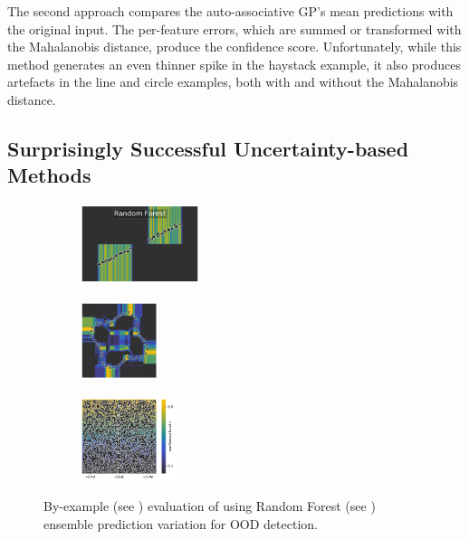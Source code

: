The second approach compares the auto-associative GP's mean predictions with the original input. The per-feature errors, which are summed or transformed with the Mahalanobis distance, produce the confidence score. Unfortunately, while this method generates an even thinner spike in the haystack example, it also produces artefacts in the line and circle examples, both with and without the Mahalanobis distance.

\subsection{Surprisingly Successful Uncertainty-based Methods} \label{txt:ood-detection-analysis-uq}

\begin{figure}[H]
    \centering
    \begin{subfigure}
        \centering
        \includegraphics[width=0.388\textwidth,valign=t]{ood-detection/figures/ood-detection/confidence-line-rf.pdf}
    \end{subfigure}
    \begin{subfigure}
        \centering
        \includegraphics[width=0.254\textwidth,valign=t]{ood-detection/figures/ood-detection/confidence-circle-rf.pdf}
    \end{subfigure}
    \begin{subfigure}
        \centering
        \includegraphics[width=0.308\textwidth,valign=t]{ood-detection/figures/ood-detection/confidence-haystack-rf.pdf}
    \end{subfigure}

    \caption[Random Forest Uncertainty for OOD Detection]{By-example (see ) evaluation of using Random Forest (see ) ensemble prediction variation for OOD detection.}
    \label{fig:uq-rf-ood-detection}
\end{figure}

